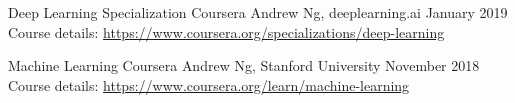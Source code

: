 
\begin{cventries}
   
  \cventry
    {Deep Learning Specialization}
    {Coursera}
    {Andrew Ng, deeplearning.ai}
    {January 2019}
    {Course details: \url{https://www.coursera.org/specializations/deep-learning}}

  \cventry
    {Machine Learning}
    {Coursera}
    {Andrew Ng, Stanford University}
    {November 2018}
    {Course details: \url{https://www.coursera.org/learn/machine-learning}}
    
\end{cventries}
